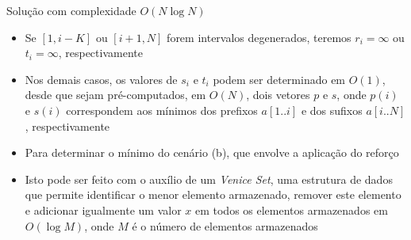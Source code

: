 \begin{frame}[fragile]{Solução com complexidade $O(N\log N)$}

    \begin{itemize}
        \item Se $[1, i - K]$ ou $[i + 1, N]$ forem intervalos degenerados, teremos $r_i = \infty$ ou
            $t_i = \infty$, respectivamente

        \item Nos demais casos, os valores de $s_i$ e $t_i$ podem ser determinado em $O(1)$, desde que
            sejam pré-computados, em $O(N)$, dois vetores $p$ e $s$, onde $p(i)$ e $s(i)$ correspondem
            aos mínimos dos prefixos $a[1..i]$ e dos sufixos $a[i..N]$, respectivamente

        \item Para determinar o mínimo do cenário (b), que envolve a aplicação do reforço

        \item Isto pode ser feito com o auxílio de um \textit{Venice Set}, uma estrutura de dados que
            permite identificar o menor elemento armazenado, remover este elemento e adicionar igualmente
            um valor $x$ em todos os elementos armazenados em $O(\log M)$, onde $M$ é o número de 
            elementos armazenados
    \end{itemize}

\end{frame}

